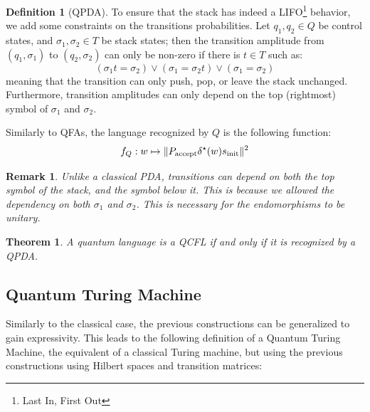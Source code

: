 \documentclass[12pt,a4paper]{article}
\theoremstyle{plain}
\newtheorem*{theorem}{Theorem}
\newtheorem*{remark}{Remark}
\theoremstyle{definition}
\newtheorem*{definition}{Definition}
\begin{document}
\begin{definition}[QPDA]
    To ensure that the stack has indeed a LIFO\footnote{Last In, First Out} behavior, we add some constraints on the transitions probabilities. Let $q_1, q_2\in Q$ be control states, and $\sigma_1, \sigma_2\in T$ be stack states; then the transition amplitude from $(q_1, \sigma_1)$ to $(q_2, \sigma_2)$ can only be non-zero if there is $t\in T$ such as:
    \begin{equation*}
        (\sigma_1t = \sigma_2) \lor (\sigma_1 = \sigma_2t) \lor (\sigma_1 = \sigma_2)
    \end{equation*}
    meaning that the transition can only push, pop, or leave the stack unchanged. Furthermore, transition amplitudes can only depend on the top (rightmost) symbol of $\sigma_1$ and $\sigma_2$.

    Similarly to QFAs, the language recognized by $Q$ is the following function:
    \begin{equation*}
        f_Q : w \mapsto \|P_{\textnormal{accept}}\delta^\star(w)s_{\textnormal{init}}\|^2
    \end{equation*}
\end{definition}

\begin{remark}
    Unlike a classical PDA, transitions can depend on both the top symbol of the stack, and the symbol below it. This is because we allowed the dependency on both $\sigma_1$ and $\sigma_2$. This is necessary for the endomorphisms to be unitary. 
\end{remark}

\begin{theorem}
    A quantum language is a QCFL if and only if it is recognized by a QPDA.
\end{theorem}

\subsection{Quantum Turing Machine}
Similarly to the classical case, the previous constructions can be generalized to gain expressivity. This leads to the following definition of a Quantum Turing Machine\cite{qtm-circuits}\cite{qc-theory-bernstein}, the equivalent of a classical Turing machine, but using the previous constructions using Hilbert spaces and transition matrices:
\end{document}
